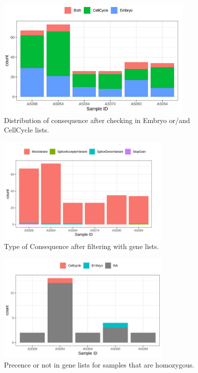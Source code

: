 \documentclass[
tikz,
11pt, %
oneside, %
english, %
singlespacing, %
headsepline, %
]{MastersDoctoralThesisV2} %
\begin{document}
\begin{figure}[H]
\centering
\includegraphics[width=0.85\textwidth]{fig/script_rawFiltering_CellEmbryo.PNG}
\decoRule
\caption[Raw Filtering]{Distribution of consequence after checking in Embryo or/and CellCycle lists.}
\label{fig:script_rawFiltering_CellEmbryo}
\end{figure}

\begin{figure}[H]
\centering
\includegraphics[width=0.75\textwidth]{fig/script_rawFiltering_geneList.PNG}
\decoRule
\caption[Raw Filtering]{Type of Consequence after filtering with gene lists.}
\label{fig:script_rawFiltering_geneList}
\end{figure}

\begin{figure}[H]
\centering
\includegraphics[width=0.75\textwidth]{fig/script_rawFiltering_CellEmbryo_homozygous.png}
\decoRule
\caption[Raw Filtering]{Precence or not in gene lists for samples that are homozygous.}
\label{fig:script_rawFiltering_CellEmbryo_homozygous}
\end{figure}
\end{document}
